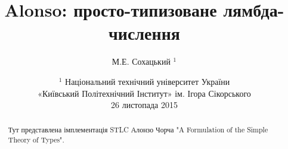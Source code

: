 \documentclass{article}
\begin{document}
\author { М.Е. Сохацький $^1$ }
\title { Alonso: просто-типизоване лямбда-числення }
\date{ \small $^1$ Національний технічний університет України \\
       «Київський Політехнічний Інститут» ім. Ігора Сікорського \\
       26 листопада 2015 }
\maketitle

\begin{abstract}
Тут представлена імплементація STLC Алонзо Чорча "A Formulation of the Simple Theory of Types".

\end{abstract}
\end{document}
